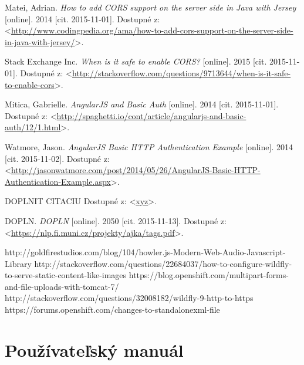 \documentclass[12pt,oneside]{fithesis2}
\begin{document}
\begin{thebibliography}{59}
  		Matei, Adrian.
  		\emph{How to add CORS support on the server side in Java with Jersey}
  		[online].
  		2014
  		[cit. 2015-11-01].
  		Dostupné z: <\url{http://www.codingpedia.org/ama/how-to-add-cors-support-on-the-server-side-in-java-with-jersey/}>.
  		
  		Stack Exchange Inc.
  		\emph{When is it safe to enable CORS?}
  		[online].
  		2015
  		[cit. 2015-11-01].
  		Dostupné z: <\url{http://stackoverflow.com/questions/9713644/when-is-it-safe-to-enable-cors}>.
  		
  		Mitica, Gabrielle.
  		\emph{AngularJS and Basic Auth}
  		[online].
  		2014
  		[cit. 2015-11-01].
  		Dostupné z: <\url{http://spaghetti.io/cont/article/angularjs-and-basic-auth/12/1.html}>.
  		
  		Watmore, Jason.
  		\emph{AngularJS Basic HTTP Authentication Example}
  		[online].
  		2014
  		[cit. 2015-11-02].
  		Dostupné z: <\url{http://jasonwatmore.com/post/2014/05/26/AngularJS-Basic-HTTP-Authentication-Example.aspx}>.
  		
		DOPLNIT CITACIU
  		Dostupné z: <\url{xyz}>.
  		
  		DOPLN.
  		\emph{DOPLN}
  		[online].
  		2050
  		[cit. 2015-11-13].
  		Dostupné z: <\url{https://nlp.fi.muni.cz/projekty/ajka/tags.pdf}>.
  		
  		http://goldfirestudios.com/blog/104/howler.js-Modern-Web-Audio-Javascript-Library
  		http://stackoverflow.com/questions/22684037/how-to-configure-wildfly-to-serve-static-content-like-images
  		https://blog.openshift.com/multipart-forms-and-file-uploads-with-tomcat-7/
  		http://stackoverflow.com/questions/32008182/wildfly-9-http-to-https
  		https://forums.openshift.com/changes-to-standalonexml-file
  		
  		  			
	\end{thebibliography} 
	
    \appendix
    \chapter{Používateľský manuál} 	  %
\end{document}

